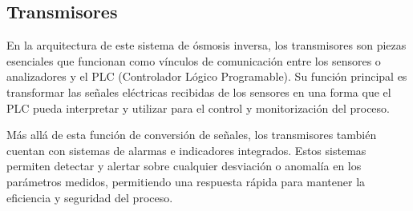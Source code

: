 
\subsection{Transmisores}

En la arquitectura de este sistema de ósmosis inversa, los transmisores son piezas esenciales que funcionan como vínculos de
comunicación entre los sensores o analizadores y el PLC (Controlador Lógico Programable).
Su función principal es transformar las señales eléctricas recibidas de los sensores en una forma que el
PLC pueda interpretar y utilizar para el control y monitorización del proceso.

Más allá de esta función de conversión de señales, los transmisores también cuentan con sistemas de alarmas e indicadores
integrados. Estos sistemas permiten detectar y alertar sobre cualquier desviación o
anomalía en los parámetros medidos, permitiendo una respuesta rápida para mantener la eficiencia y seguridad del proceso.


